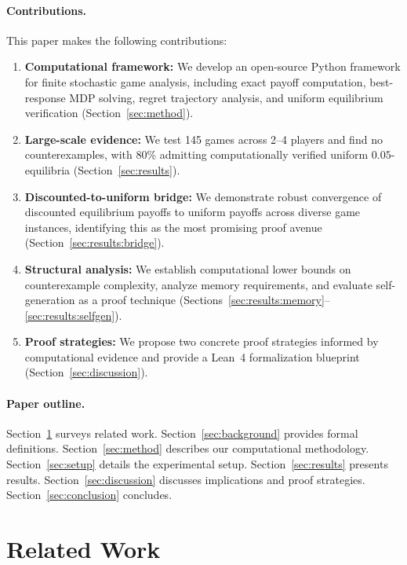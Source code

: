 \documentclass[11pt,a4paper]{article}
\theoremstyle{definition}
\begin{document}
\paragraph{Contributions.}
This paper makes the following contributions:
\begin{enumerate}[label=(\arabic*),leftmargin=2em]
    \item \textbf{Computational framework:} We develop an open-source Python framework for finite stochastic game analysis, including exact payoff computation, best-response MDP solving, regret trajectory analysis, and uniform equilibrium verification (Section~\ref{sec:method}).
    \item \textbf{Large-scale evidence:} We test 145 games across 2--4 players and find no counterexamples, with 80\% admitting computationally verified uniform $0.05$-equilibria (Section~\ref{sec:results}).
    \item \textbf{Discounted-to-uniform bridge:} We demonstrate robust convergence of discounted equilibrium payoffs to uniform payoffs across diverse game instances, identifying this as the most promising proof avenue (Section~\ref{sec:results:bridge}).
    \item \textbf{Structural analysis:} We establish computational lower bounds on counterexample complexity, analyze memory requirements, and evaluate self-generation as a proof technique (Sections~\ref{sec:results:memory}--\ref{sec:results:selfgen}).
    \item \textbf{Proof strategies:} We propose two concrete proof strategies informed by computational evidence and provide a Lean~4 formalization blueprint (Section~\ref{sec:discussion}).
\end{enumerate}

\paragraph{Paper outline.}
Section~\ref{sec:related} surveys related work.
Section~\ref{sec:background} provides formal definitions.
Section~\ref{sec:method} describes our computational methodology.
Section~\ref{sec:setup} details the experimental setup.
Section~\ref{sec:results} presents results.
Section~\ref{sec:discussion} discusses implications and proof strategies.
Section~\ref{sec:conclusion} concludes.

\section{Related Work}\label{sec:related}
\end{document}
